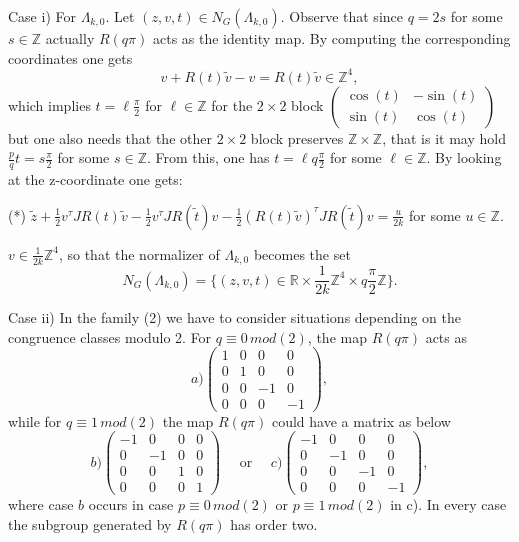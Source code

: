 \documentclass[11pt]{amsart}
\theoremstyle{plain}
\theoremstyle{definition}
\theoremstyle{remark}
\begin{document}
   Case i) For $\Lambda_{k,0}$.   Let $(z,v,t)\in N_G(\Lambda_{k,0})$.  Observe that since  $q=2s$ for some $s\in \mathbb Z$  actually   $R(q\pi)$ acts as the identity map.  By computing the corresponding coordinates one gets
  $$v + R(t)\tilde{v}-v= R(t)\tilde{v}\in \mathbb Z^4,$$
  which implies $t= \ell\frac{\pi}2$ for $\ell\in \mathbb Z$ for the $2\times 2$ block $\left( \begin{matrix}
  	\cos(t) & -\sin(t)\\ \sin(t) & \cos(t) 
  \end{matrix}\right)$ but one also needs that  the other $2\times 2$ block preserves $\mathbb Z \times \mathbb Z$, that is it may hold $\frac{p}q t = s\frac{\pi}2$ for some $s\in \mathbb Z$. From this, one has $t=\ell q\frac{\pi}2$ for some $\ell \in \mathbb Z$.  By looking at the z-coordinate one gets:
  
  \smallskip
  
 (*) \quad  $\tilde{z}+\frac12 v^{\tau}JR(t)\tilde{v}-\frac12 v^{\tau}JR(\tilde{t})v-\frac12(R(t)\tilde{v})^{\tau}JR(\tilde{t})v= \frac{u}{2k}$ for some $u\in \mathbb Z$. 
  
  \smallskip
  
  $v\in \frac{1}{2k}\mathbb Z^4$, so that the normalizer of $\Lambda_{k,0}$ becomes the set 
  \begin{equation}\label{normalizer1}N_G(\Lambda_{k,0})=\{(z,v,t)\in \mathbb R\times \frac{1}{2k}\mathbb Z^4\times q\frac{\pi}2\mathbb Z\}.
  \end{equation}
  
  \smallskip
  
  Case ii)   In the family (2) we have to consider situations depending on the congruence classes modulo 2. For $q\equiv 0 \,mod(2)$, the map $R(q\pi)$ acts as 
  $$a) \left( \begin{matrix} 
  1 & 0 & 0 & 0\\
  0 & 1 & 0 & 0\\
  0 & 0 & -1 & 0\\
  0 & 0 & 0 & -1
  \end{matrix}
  \right),$$
  while for $q\equiv 1\,mod(2)$ the map $R(q\pi)$ could have  a matrix as below
  $$b)  \left( \begin{matrix} 
  -1 & 0 & 0 & 0\\
  0 & -1 &0 & 0\\
  0 & 0 & 1 & 0\\
  0 & 0 & 0 & 1
  \end{matrix}
  \right)\quad \mbox{ or } \quad  c) \left( \begin{matrix} 
  -1 & 0 & 0 & 0\\
  0 & -1 &0 & 0\\
  0 & 0 & -1 & 0\\
  0 & 0 & 0 & -1
  \end{matrix}
  \right), 
  $$
  where case $b$ occurs in case $p\equiv 0\, mod(2)$ or $p\equiv 1\, mod(2)$ in c). In every case the subgroup generated by $R(q\pi)$ has order two.  
  
\end{document}
